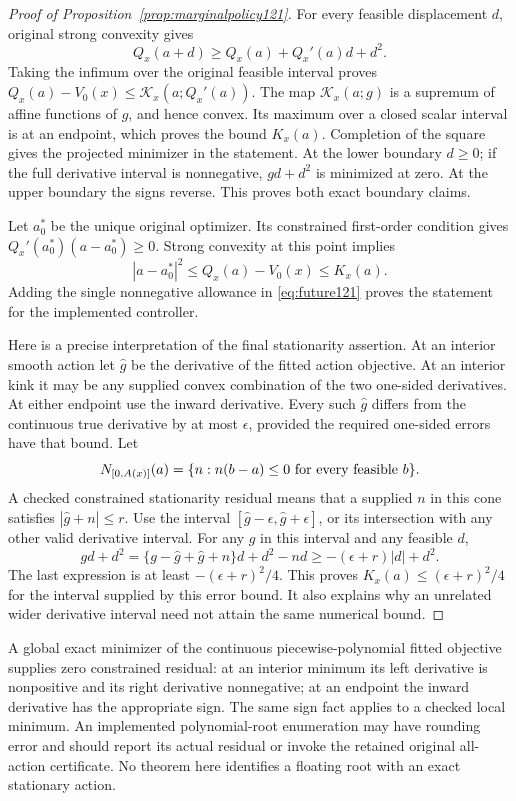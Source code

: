 \begin{proof}[Proof of Proposition~\ref{prop:marginalpolicy121}]
For every feasible displacement \(d\), original
strong convexity gives
\[
 Q_x(a+d)\geq Q_x(a)+Q_x'(a)d+d^2.
\]
Taking the infimum over the original feasible
interval proves
\(Q_x(a)-V_0(x)\leq\mathcal K_x(a;Q_x'(a))\).
The map \(\mathcal K_x(a;g)\) is a supremum
of affine functions of \(g\), and hence convex.
Its maximum over a closed scalar interval is at
an endpoint, which proves the bound \(K_x(a)\).
Completion of the square gives the projected
minimizer in the statement.
At the lower boundary \(d\geq0\); if the full
derivative interval is nonnegative, \(gd+d^2\)
is minimized at zero.  At the upper boundary
the signs reverse.  This proves both exact
boundary claims.

Let \(a_0^*\) be the unique original optimizer.
Its constrained first-order condition gives
\(Q_x'(a_0^*)(a-a_0^*)\geq0\).
Strong convexity at this point implies
\[
 |a-a_0^*|^2\leq Q_x(a)-V_0(x)\leq K_x(a).
\]
Adding the single nonnegative allowance in
\eqref{eq:future121} proves the statement
for the implemented controller.

Here is a precise interpretation of the final
stationarity assertion.  At an interior smooth
action let \(\widehat g\) be the derivative of
the fitted action objective.  At an interior
kink it may be any supplied convex combination
of the two one-sided derivatives.
At either endpoint use the inward derivative.
Every such \(\widehat g\) differs from the
continuous true derivative by at most
\(\epsilon\), provided the required one-sided
errors have that bound.
Let
\[
 N_{[0,A(x)]}(a)
   =\{n:n(b-a)\leq0\ \hbox{for every feasible }b\}.
\]
A checked constrained stationarity residual
means that a supplied \(n\) in this cone
satisfies \(|\widehat g+n|\leq r\).
Use the interval
\([\widehat g-\epsilon,\widehat g+\epsilon]\),
or its intersection with any other valid
derivative interval.
For any \(g\) in this interval and any
feasible \(d\),
\[
 gd+d^2
  =\{g-\widehat g+\widehat g+n\}d+d^2-nd
  \geq-(\epsilon+r)|d|+d^2.
\]
The last expression is at least
\(-(\epsilon+r)^2/4\).
This proves \(K_x(a)\leq(\epsilon+r)^2/4\)
for the interval supplied by this error
bound.  It also explains why an unrelated
wider derivative interval need not attain
the same numerical bound.
\end{proof}

A global exact minimizer of the continuous
piecewise-polynomial fitted objective supplies
zero constrained residual: at an interior
minimum its left derivative is nonpositive
and its right derivative nonnegative; at an
endpoint the inward derivative has the
appropriate sign.  The same sign fact applies
to a checked local minimum.
An implemented polynomial-root enumeration
may have rounding error and should report its
actual residual or invoke the retained
original all-action certificate.
No theorem here identifies a floating root
with an exact stationary action.

